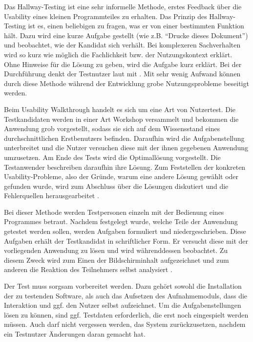 Das Hallway-Testing ist eine sehr informelle Methode, erstes Feedback über die Usability eines kleinen Programmteiles zu erhalten. Das Prinzip des Hallway-Testing ist es, einen beliebigen zu fragen, was er von einer bestimmten Funktion hält. Dazu wird eine kurze Aufgabe gestellt (wie z.B. \enquote{Drucke dieses Dokument}) und beobachtet, wie der Kandidat sich verhält. Bei komplexeren Sachverhalten wird so kurz wie möglich die Fachlichkeit bzw. der Nutzungskontext erklärt. Ohne Hinweise für die Lösung zu geben, wird die Aufgabe kurz erklärt. Bei der Durchführung denkt der Testnutzer laut mit \cite[S. 226]{Ullenboom2014}.
Mit sehr wenig Aufwand können durch diese Methode während der Entwicklung grobe Nutzungsprobleme beseitigt werden.\par
{}
Beim Usability Walkthrough handelt es sich um eine Art von Nutzertest. Die Testkandidaten werden in einer Art Workshop versammelt und bekommen die Anwendung grob vorgestellt, sodass sie sich auf dem Wissensstand eines durchschnittlichen Erstbenutzers befinden. Daraufhin wird die Aufgabenstellung unterbreitet und die Nutzer versuchen diese mit der ihnen gegebenen Anwendung umzusetzen. Am Ende des Tests wird die Optimallösung vorgestellt. Die Testanwender beschreiben daraufhin ihre Lösung. Zum Feststellen der konkreten Usability-Probleme, also der Gründe, warum eine andere Lösung gewählt oder gefunden wurde, wird zum Abschluss über die Lösungen diskutiert und die Fehlerquellen herausgearbeitet \cite[S. 228]{Ullenboom2014}.\par
{}
Bei dieser Methode werden Testpersonen einzeln mit der Bedienung eines Programmes betraut. Nachdem festgelegt wurde, welche Teile der Anwendung getestet werden sollen, werden Aufgaben formuliert und niedergeschrieben. Diese Aufgaben erhält der Testkandidat in schriftlicher Form. Er versucht diese mit der vorliegenden Anwendung zu lösen und wird währenddessen beobachtet. Zu diesem Zweck wird zum Einen der Bildschirminhalt aufgezeichnet und zum anderen die Reaktion des Teilnehmers selbst analysiert \cite[S. 230]{Ullenboom2014}.\par
Der Test muss sorgsam vorbereitet werden. Dazu gehört sowohl die Installation der zu testenden Software, als auch das Aufsetzen des Aufnahmemoduls, dass die Interaktion und ggf. den Nutzer selbst aufzeichnet. Um die Aufgabenstellungen lösen zu können, sind ggf. Testdaten erforderlich, die erst noch eingespielt werden müssen. Auch darf nicht vergessen werden, das System zurückzusetzen, nachdem ein Testnutzer Änderungen daran gemacht hat. \cite[S.231]{Ullenboom2014}\par
